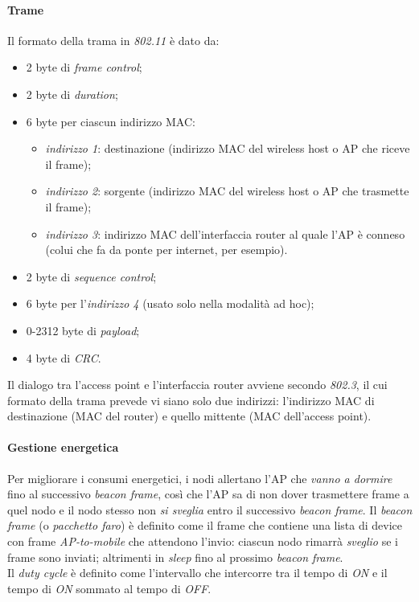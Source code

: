 \paragraph{Trame}
Il formato della trama in \textit{802.11} è dato da:
\begin{itemize}
	\item 2 byte di \textit{frame control};
	\item 2 byte di \textit{duration};
	\item 6 byte per ciascun indirizzo MAC:
	\begin{itemize}
		\item \textit{indirizzo 1}: destinazione (indirizzo MAC del wireless host o AP che riceve il frame);
		\item \textit{indirizzo 2}: sorgente (indirizzo MAC del wireless host o AP che trasmette il frame);
		\item \textit{indirizzo 3}: indirizzo MAC dell'interfaccia router al quale l'AP è conneso (colui che fa da ponte per internet, per esempio).
	\end{itemize}
	\item 2 byte di \textit{sequence control};
	\item 6 byte per l'\textit{indirizzo 4} (usato solo nella modalità ad hoc);
	\item 0-2312 byte di \textit{payload};
	\item 4 byte di \textit{CRC}.
\end{itemize}
Il dialogo tra l'access point e l'interfaccia router avviene secondo \textit{802.3}, il cui formato della trama prevede vi siano solo due indirizzi: l'indirizzo MAC di destinazione (MAC del router) e quello mittente (MAC dell'access point).

\paragraph{Gestione energetica}
Per migliorare i consumi energetici, i nodi allertano l'AP che \textit{vanno a dormire} fino al successivo \textit{beacon frame}, così che l'AP sa di non dover trasmettere frame a quel nodo e il nodo stesso non \textit{si sveglia} entro il successivo \textit{beacon frame}.
Il \textit{beacon frame} (o \textit{pacchetto faro}) è definito come il frame che contiene una lista di device con frame \textit{AP-to-mobile} che attendono l'invio: ciascun nodo rimarrà \textit{sveglio} se i frame sono inviati; altrimenti in \textit{sleep} fino al prossimo \textit{beacon frame}. \\
Il \textit{duty cycle} è definito come l'intervallo che intercorre tra il tempo di \textit{ON} e il tempo di \textit{ON} sommato al tempo di \textit{OFF}.

